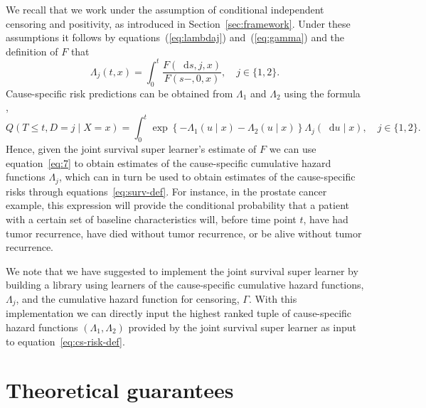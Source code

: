 \documentclass[a4paper,danish]{article}
\theoremstyle{plain} %
\numberwithin{theorem}{section}
\theoremstyle{definition} %
\theoremstyle{remark}
\newcommand*\diff{\mathop{}\!\mathrm{d}}
\newcommand{\1}{\mathds{1}}
\begin{document}
We recall that we work under the assumption of conditional independent
censoring and positivity, as introduced in
Section~\ref{sec:framework}. Under these assumptions it follows by
equations~(\ref{eq:lambdaj}) and~(\ref{eq:gamma}) and the definition
of \( F \) that
\begin{equation}
  \label{eq:7}
  \Lambda_j(t , x) 
  = \int_0^t  \frac{F(\diff s, j, x )}{F(s-, 0, x )},
  \quad j \in \{1,2\}.
\end{equation}
Cause-specific risk predictions can be obtained from \( \Lambda_1 \)
and $\Lambda_2$ using the formula
\citep[e.g.,][]{benichou1990estimates, ozenne2017riskregression},
\begin{equation}
  \label{eq:cs-risk-def}
  Q(T \leq t, D = j \mid X=x) =
  \int_0^t \exp\left\{-\Lambda_{1}(u \mid x)-\Lambda_{2}(u
    \mid x)\right\}  \Lambda_j(\diff u \mid x),
  \quad j \in \{1,2\}.
\end{equation}
Hence, given the joint survival super learner's estimate of \( F \) we can use
equation~\eqref{eq:7} to obtain estimates of the cause-specific
cumulative hazard functions $\Lambda_j$, which can in turn be used to
obtain estimates of the cause-specific risks through
equations~\eqref{eq:surv-def}. For instance, in the prostate cancer
example, this expression will provide the conditional probability that
a patient with a certain set of baseline characteristics will, before
time point \( t \), have had tumor recurrence, have died without tumor
recurrence, or be alive without tumor recurrence.

We note that we have suggested to implement the joint survival super learner by building a library
using learners of the cause-specific cumulative hazard functions,
$\Lambda_j$, and the cumulative hazard function for censoring,
$\Gamma$. With this implementation we can directly input the highest
ranked tuple of cause-specific hazard functions
$(\Lambda_1, \Lambda_2)$ provided by the joint survival super learner as input to
equation~\eqref{eq:cs-risk-def}.

\section{Theoretical guarantees}
\label{sec:theor-results-prop}
\end{document}
